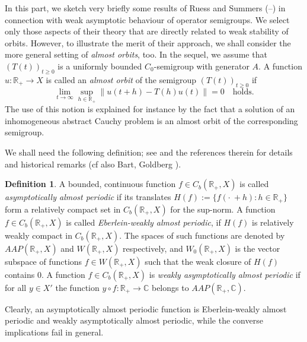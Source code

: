 \documentclass[11pt,intlimits, draft,oneside]{amsart}
\theoremstyle{definition}
\newtheorem{defi}[thm]{Definition}
\def\RR{\mathbb{R}}
\def\CC{\mathbb{C}}
\begin{document}
In this part, we sketch very briefly some results of Ruess and
Summers (\cite{ruess/summers:1986}--\cite{ruess/summers:1992jmaa}) in connection with weak asymptotic behaviour of operator
semigroups. We select only those aspects of their theory that are
directly related to weak stability of orbits. However, to illustrate
the merit of their approach, we shall consider the more general
setting of \emph{almost orbits}, too. In the sequel, we assume that
$(T(t))_{t\geq 0}$ is a uniformly bounded $C_0$-semigroup with
generator $A$. A function $u:\RR_+\to X$ is called an \emph{almost
orbit} of the semigroup $(T(t))_{t\geq 0}$ if
\begin{equation*}
\lim_{t\to\infty}\sup_{h\in\RR_+}\|u(t+h)-T(h)u(t)\|=0\quad\mbox{holds}.
\end{equation*}
The use of this notion is explained for instance by the fact that a
solution of an inhomogeneous abstract Cauchy problem is an almost
orbit of the corresponding semigroup.



We shall need the following definition; see
\cite{ruess/summers:1986} and the references therein for details and
historical remarks (cf also Bart, Goldberg \cite{bart/goldberg:1978}).

\begin{defi}A bounded, continuous function $f\in C_b(\RR_+,X)$ is called
\emph{asymptotically almost periodic} if its translates
$H(f):=\{f(\cdot\:+h):h\in \RR_+\}$ form a relatively compact set in
$C_b(\RR_+,X)$ for the sup-norm. A function $f\in C_b(\RR_+,X)$ is
called \emph{Eberlein-weakly almost periodic}, if $H(f)$ is
relatively weakly compact in $C_b(\RR_+,X)$. The spaces of such
functions are denoted by $AAP(\RR_+,X)$ and $W(\RR_+,X)$
respectively, and $W_0(\RR_+,X)$ is the vector subspace of functions
$f\in W(\RR_+,X)$ such that the weak closure of $H(f)$ contains $0$.
A function $f\in C_b(\RR_+,X)$ is \emph{weakly asymptotically almost
periodic} if for all $y\in X'$ the function $y\circ f:\RR_+\to\CC$
belongs to $AAP(\RR_+,\CC)$.
\end{defi}
Clearly, an asymptotically almost periodic function is
Eberlein-weakly almost periodic and weakly asymptotically almost
periodic, while the converse implications fail in general.
\end{document}
